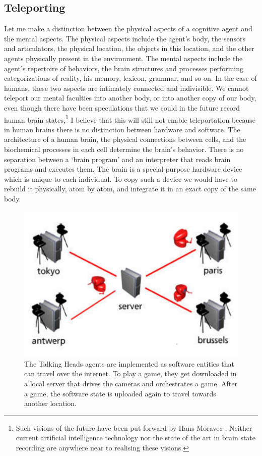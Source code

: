 \subsection{Teleporting}

Let me make a distinction between the physical aspects of 
a cognitive agent and the mental aspects. The physical aspects include the 
agent's body, the sensors and articulators, 
the physical location, the objects in this location, and the other
agents physically present in the environment. The 
mental aspects include the agent's repertoire of behaviors, 
the brain structures and processes
performing categorizations of reality, his
memory, lexicon, grammar, and so on. 
In the case of humans, these two aspects are intimately 
connected and indivisible. We cannot teleport our mental 
faculties into another body, or into another copy of 
our body, even though there have been speculations that 
we could in the future record human 
brain states,\footnote{
Such visions of the future have been put forward
by Hans Moravec \cite{Moravec:1995}. Neither current artificial intelligence technology nor
the state of the art in brain state recording are anywhere 
near to realising these visions.}
I believe that this will still not enable teleportation
because in human brains there is no distinction between 
hardware and software. The architecture of a human brain, 
the physical connections between cells, and the 
biochemical processes in each cell determine the brain's behavior.
There is no separation between a `brain program' and
an interpreter that reads brain programs and 
executes them. The brain is a special-purpose 
hardware device which is unique to each individual. 
To copy such a device we would have to rebuild it physically,
atom by atom, and integrate it in an exact copy of the 
same body. 

\begin{figure}[htbp]
  \centerline{\includegraphics[width=.50\textwidth]{chap1/figs/teleportation}}
\caption{ The Talking Heads agents are implemented as software entities that can travel over the internet. 
To play a game, they get downloaded in a local server that drives the cameras and orchestrates a game. After a game, the software 
state is uploaded again to travel towards another location.}
\label{f:teleport}
\end{figure}

